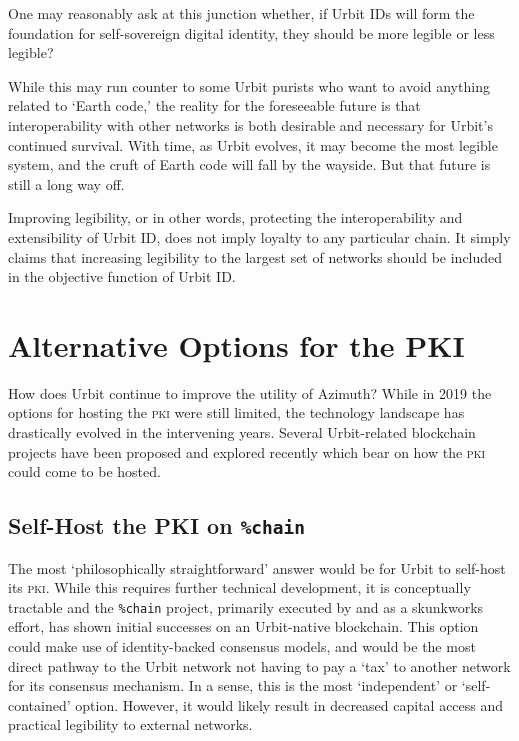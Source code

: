 \documentclass[twoside]{article}
\begin{document}
One may reasonably ask at this junction whether, if Urbit IDs will form the foundation for self-sovereign digital identity, they should be more legible or less legible?

While this may run counter to some Urbit purists who want to avoid anything related to `Earth code,' the reality for the foreseeable future is that interoperability with other networks is both desirable and necessary for Urbit's continued survival. With time, as Urbit evolves, it may become the most legible system, and the cruft of Earth code will fall by the wayside. But that future is still a long way off.

Improving legibility, or in other words, protecting the interoperability and extensibility of Urbit ID, does not imply loyalty to any particular chain. It simply claims that increasing legibility to the largest set of networks should be included in the objective function of Urbit ID.

\section[{Alternative Options for the \textsc{pki}}]{Alternative Options for the PKI}

How does Urbit continue to improve the utility of Azimuth? While in 2019 the options for hosting the \textsc{pki} were still limited, the technology landscape has drastically evolved in the intervening years.  Several Urbit-related blockchain projects have been proposed and explored recently which bear on how the \textsc{pki} could come to be hosted.

\subsection[Self-Host the \textsc{pki} on \texttt{\%chain}]{Self-Host the PKI on \texttt{\%chain}}

The most `philosophically straightforward' answer would be for Urbit to self-host its \textsc{pki}. While this requires further technical development, it is conceptually tractable and the \lstinline[style=inlinecode]{%chain} project, primarily executed by  and  as a skunkworks effort, has shown initial successes on an Urbit-native blockchain. This option could make use of identity-backed consensus models, and would be the most direct pathway to the Urbit network not having to pay a `tax' to another network for its consensus mechanism. In a sense, this is the most `independent' or `self-contained' option. However, it would likely result in decreased capital access and practical legibility to external networks.
\end{document}
